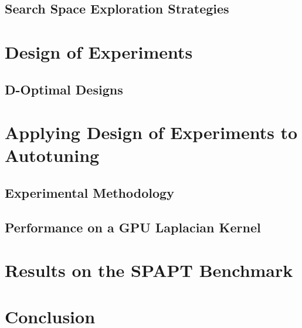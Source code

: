 \documentclass[conference]{IEEEtran}
\begin{document}
\subsection{Search Space Exploration Strategies}
\label{sec:orgc7165d4}

\section{Design of Experiments}
\label{sec:org1a508b1}
\subsection{D-Optimal Designs}
\label{sec:orgb65403c}

\section{Applying Design of Experiments to Autotuning}
\label{sec:org7e7566d}

\subsection{Experimental Methodology}
\label{sec:org7d30f97}
\subsection{Performance on a GPU Laplacian Kernel}
\label{sec:orgca83fb2}

\section{Results on the SPAPT Benchmark}
\label{sec:org2ebd0ab}

\section{Conclusion}
\label{sec:org5e5218a}
\end{document}

